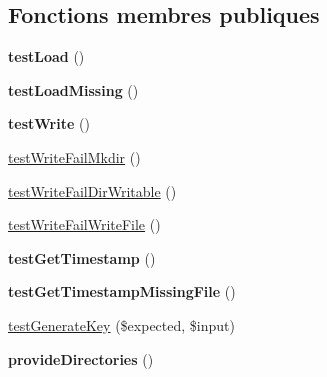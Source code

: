 \subsection*{Fonctions membres publiques}
\begin{DoxyCompactItemize}
\item 
{\bfseries test\+Load} ()\hypertarget{class_twig___tests___cache___filesystem_test_a0f933e014a448086f3a146751b71d93a}{}\label{class_twig___tests___cache___filesystem_test_a0f933e014a448086f3a146751b71d93a}

\item 
{\bfseries test\+Load\+Missing} ()\hypertarget{class_twig___tests___cache___filesystem_test_a6bb7c03b295b5729664e97097f1b5b11}{}\label{class_twig___tests___cache___filesystem_test_a6bb7c03b295b5729664e97097f1b5b11}

\item 
{\bfseries test\+Write} ()\hypertarget{class_twig___tests___cache___filesystem_test_a8e40254a5a08199e3b4fde257ceebd31}{}\label{class_twig___tests___cache___filesystem_test_a8e40254a5a08199e3b4fde257ceebd31}

\item 
\hyperlink{class_twig___tests___cache___filesystem_test_ad30f911b5ff44639d2366256f566c0b1}{test\+Write\+Fail\+Mkdir} ()
\item 
\hyperlink{class_twig___tests___cache___filesystem_test_a8a121f35a74651fc1bf4d35acfe0b712}{test\+Write\+Fail\+Dir\+Writable} ()
\item 
\hyperlink{class_twig___tests___cache___filesystem_test_ae6d9c50966299c192149feb6819eb781}{test\+Write\+Fail\+Write\+File} ()
\item 
{\bfseries test\+Get\+Timestamp} ()\hypertarget{class_twig___tests___cache___filesystem_test_a2c682cd2066663bf842e14c1fbffded6}{}\label{class_twig___tests___cache___filesystem_test_a2c682cd2066663bf842e14c1fbffded6}

\item 
{\bfseries test\+Get\+Timestamp\+Missing\+File} ()\hypertarget{class_twig___tests___cache___filesystem_test_a9bd4f5ce27b7ba1077d918dea5377ed6}{}\label{class_twig___tests___cache___filesystem_test_a9bd4f5ce27b7ba1077d918dea5377ed6}

\item 
\hyperlink{class_twig___tests___cache___filesystem_test_abac79db0e974433934e165d6e3560476}{test\+Generate\+Key} (\$expected, \$input)
\item 
{\bfseries provide\+Directories} ()\hypertarget{class_twig___tests___cache___filesystem_test_a8caee97f79d962f012d7a17e9a37ed51}{}\label{class_twig___tests___cache___filesystem_test_a8caee97f79d962f012d7a17e9a37ed51}

\end{DoxyCompactItemize}
